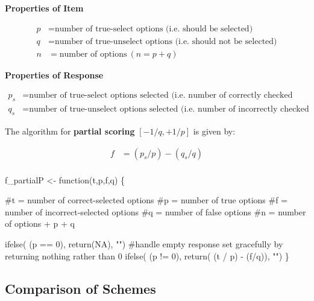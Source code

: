 \documentclass[
  letterpaper,
  DIV=11,
  numbers=noendperiod]{scrreprt}
\newenvironment{Shaded}{\begin{snugshade}}{\end{snugshade}}
\newcommand{\CommentTok}[1]{\textcolor[rgb]{0.37,0.37,0.37}{#1}}
\newcommand{\ConstantTok}[1]{\textcolor[rgb]{0.56,0.35,0.01}{#1}}
\newcommand{\ControlFlowTok}[1]{\textcolor[rgb]{0.00,0.23,0.31}{#1}}
\newcommand{\DecValTok}[1]{\textcolor[rgb]{0.68,0.00,0.00}{#1}}
\newcommand{\FunctionTok}[1]{\textcolor[rgb]{0.28,0.35,0.67}{#1}}
\newcommand{\NormalTok}[1]{\textcolor[rgb]{0.00,0.23,0.31}{#1}}
\newcommand{\OtherTok}[1]{\textcolor[rgb]{0.00,0.23,0.31}{#1}}
\newcommand{\SpecialCharTok}[1]{\textcolor[rgb]{0.37,0.37,0.37}{#1}}
\newcommand{\StringTok}[1]{\textcolor[rgb]{0.13,0.47,0.30}{#1}}
\begin{document}
\textbf{Properties of Item}

\begin{align}
p &= \text{number of true-select options (i.e. should be selected)} \\
q &= \text{number of true-unselect options (i.e. should not be selected)} \\
n &= \text{number of options} \: ( n = p + q)
\end{align}

\textbf{Properties of Response}

\begin{align}
p_s &= \text{number of true-select options selected (i.e. number of correctly checked options)}\\
q_s &= \text{number of true-unselect options selected (i.e. number of incorrectly checked options }
\end{align}

The algorithm for \textbf{partial scoring} \([-1/q, +1/p]\) is given by:

\begin{align}
f &= (p_s / p) - ({q_s}/{q}) \\
\end{align}

\begin{Shaded}
\begin{Highlighting}[]
\NormalTok{f\_partialP }\OtherTok{\textless{}{-}} \ControlFlowTok{function}\NormalTok{(t,p,f,q) \{}

  \CommentTok{\#t = number of correct{-}selected options}
  \CommentTok{\#p = number of true options}
  \CommentTok{\#f = number of incorrect{-}selected options}
  \CommentTok{\#q = number of false options}
  \CommentTok{\#n = number of options + p + q}
  
  \FunctionTok{ifelse}\NormalTok{( (p }\SpecialCharTok{==} \DecValTok{0}\NormalTok{), }\FunctionTok{return}\NormalTok{(}\ConstantTok{NA}\NormalTok{), }\StringTok{""}\NormalTok{) }\CommentTok{\#handle empty response set gracefully by returning nothing rather than 0}
  \FunctionTok{ifelse}\NormalTok{( (p }\SpecialCharTok{!=} \DecValTok{0}\NormalTok{), }\FunctionTok{return}\NormalTok{( (t }\SpecialCharTok{/}\NormalTok{ p) }\SpecialCharTok{{-}}\NormalTok{ (f}\SpecialCharTok{/}\NormalTok{q)), }\StringTok{""}\NormalTok{)}
\NormalTok{\}}
\end{Highlighting}
\end{Shaded}

\hypertarget{comparison-of-schemes}{%
\subsection{Comparison of Schemes}\label{comparison-of-schemes}}
\end{document}
